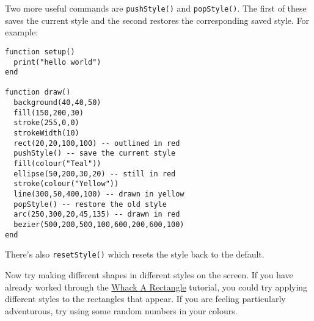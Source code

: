 \documentclass[
  xhtml,%
  use filename%
]{internet}
\begin{document}
Two more useful commands are \verb+pushStyle()+ and \verb+popStyle()+.
The first of these saves the current style and the second restores the corresponding saved style.
For example:

\begin{verbatim}
function setup()
  print("hello world")
end

function draw()
  background(40,40,50)
  fill(150,200,30)
  stroke(255,0,0)
  strokeWidth(10)
  rect(20,20,100,100) -- outlined in red
  pushStyle() -- save the current style
  fill(colour("Teal"))
  ellipse(50,200,30,20) -- still in red
  stroke(colour("Yellow"))
  line(300,50,400,100) -- drawn in yellow
  popStyle() -- restore the old style
  arc(250,300,20,45,135) -- drawn in red
  bezier(500,200,500,100,600,200,600,100)
end
\end{verbatim}

There's also \verb+resetStyle()+ which resets the style back to the default.

Now try making different shapes in different styles on the screen.
If you have already worked through the \href{WhackARect.xhtml}{Whack A Rectangle} tutorial, you could try applying different styles to the rectangles that appear.
If you are feeling particularly adventurous, try using some random numbers in your colours.
\end{document}
